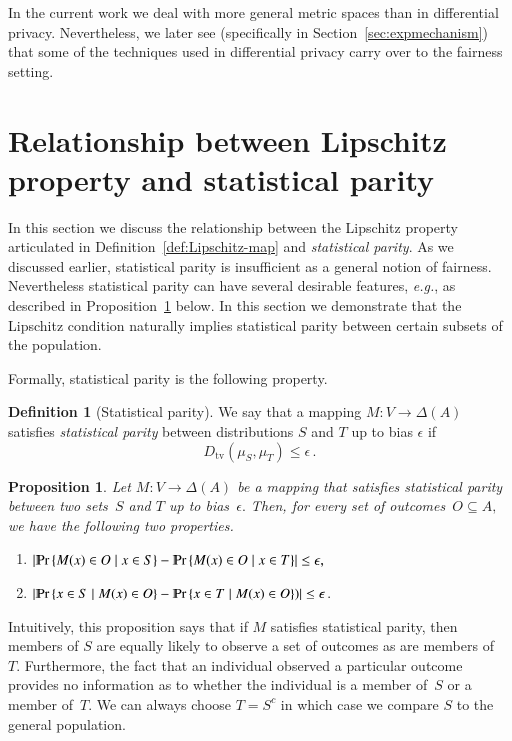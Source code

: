 \documentclass[letterpaper,11pt]{article}
\newtheorem{proposition}{Proposition}[section]
\theoremstyle{definition}
\newtheorem{definition}{Definition}[section]
\renewcommand{\mathbb}{\varmathbb}
\newcommand{\Psymb}{\mathbb{P}}
\DeclareMathOperator*{\ProbOp}{\Psymb r}
\renewcommand{\Pr}{\ProbOp}
\newcommand{\mper}{\,.}
\newcommand{\Set}[1]{\left\{#1\right\}}
\newcommand{\tv}{\mathrm{tv}}
\begin{document}
In the current work we
deal with more general metric
spaces than in differential privacy. Nevertheless, we later see (specifically in
Section~\ref{sec:expmechanism}) that some of the techniques
used in differential privacy carry over to the fairness setting.

\section{Relationship between Lipschitz property and statistical parity}
\label{sec:lip-sp}
In this section we discuss the relationship between the Lipschitz property
articulated in Definition~\ref{def:Lipschitz-map} and \emph{statistical
parity}. As we discussed earlier, statistical parity is insufficient as a
general notion of fairness. Nevertheless statistical parity can have several
desirable features,
{\it e.g.}, as described in Proposition~\ref{nice} below.  In this section we
demonstrate that the Lipschitz condition naturally implies statistical parity
between certain subsets of the population.

Formally, statistical parity is the following property.

\begin{definition}[Statistical parity]
We say that a mapping $M\colon V\to\Delta(A)$ satisfies \emph{statistical
parity} between distributions $S$ and $T$ up to bias $\epsilon$ if
\begin{equation}
D_\tv(\mu_S,\mu_T)\le\epsilon\mper
\end{equation}
\end{definition}


\begin{proposition}
\label{nice}
Let $M\colon V\to\Delta(A)$ be a mapping that satisfies statistical
parity between two sets~$S$ and $T$ up to bias~$\epsilon.$
Then, for every set of outcomes~$O\subseteq A,$
we have the following two properties.
\begin{enumerate}
\item $\left|\Pr\Set{M(x)\in O \mid x\in S}
- \Pr\Set{M(x)\in O\mid x\in T}\right|\le\epsilon,$
\item $\left|\Pr\Set{x\in S \mid M(x)\in O}-
 \Pr\Set{x\in T\mid M(x)\in O})\right|\le\epsilon\mper$
\end{enumerate}
\end{proposition}
Intuitively, this proposition says that if $M$ satisfies statistical parity,
then members of $S$ are equally likely to observe a set of outcomes as are
members of~$T.$ Furthermore, the fact that an individual observed a particular
outcome provides no information as to whether the individual is a member
of~$S$ or a member of~$T.$ We can always choose $T=S^c$ in which case we
compare $S$ to the general population.
\end{document}
